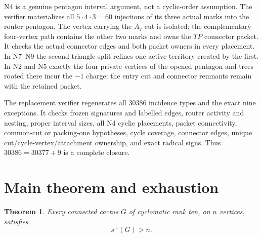 \documentclass[11pt]{article}
\newtheorem{theorem}{Theorem}[section]
\newcommand{\spE}{s^+}
\begin{document}
N4 is a genuine pentagon interval argument, not a cyclic-order assumption.
The verifier materializes all $5\cdot4\cdot3=60$ injections of its three actual
marks into the router pentagon.  The vertex carrying the $A_7$ cut is isolated;
the complementary four-vertex path contains the other two marks and owns the
$TP$ connector packet.  It checks the actual connector edges and both packet
owners in every placement.  In N7--N9 the second triangle split refines one
active territory created by the first.  In N2 and N5 exactly the four private
vertices of the opened pentagon and trees rooted there incur the $-1$ charge;
the entry cut and connector remnants remain with the retained packet.

The replacement verifier regenerates all 30386 incidence types and the exact
nine exceptions.  It checks frozen signatures and labelled edges, router
activity and nesting, proper interval sizes, all N4 cyclic placements, packet
connectivity, common-cut or packing-one hypotheses, cycle coverage, connector
edges, unique cut/cycle-vertex/attachment ownership, and exact radical signs.
Thus $30386=30377+9$ is a complete closure.

\section{Main theorem and exhaustion}

\begin{theorem}\label{thm:main}
Every connected cactus $G$ of cyclomatic rank ten, on $n$ vertices, satisfies
\[
 \boxed{\spE(G)>n}.
\]
\end{theorem}
\end{document}
